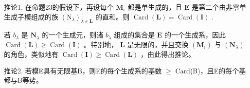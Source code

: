 推论1. 在命题23的假设下，再设每个 \(\mathbf{M}_{\iota}\) 都是单生成的，且 \(\mathbf{E}\) 是第二个由非零单生成子模组成的族 \((\mathrm{N}_{\lambda})_{\lambda \in \mathbf{L}}\) 的直和。则 \(\operatorname{Card}(\mathbf{L}) = \operatorname{Card}(\mathbf{I})\) .

若 \(b_{\lambda}\) 是 \(\mathbf{N}_{\lambda}\) 的一个生成元，则诸 \(b_{\lambda}\) 组成的集合是 \(\mathbf{E}\) 的一个生成系，因此 \(\operatorname{Card}(\mathbf{L}) \geqslant \operatorname{Card}(\mathbf{I})\) 。特别地， \(\mathbf{L}\) 是无限的，并且交换 \((\mathbf{M}_i)\) 与 \((\mathbf{N}_{\lambda})\) 的角色，类似地有 \(\operatorname{Card}(\mathbf{I}) \geqslant \operatorname{Card}(\mathbf{L})\) ，由此得出推论。

推论2. 若模E具有无限基B，则E的每个生成系的基数 \(\geqslant\) Card(B)，且E的每个基都与B等势。

